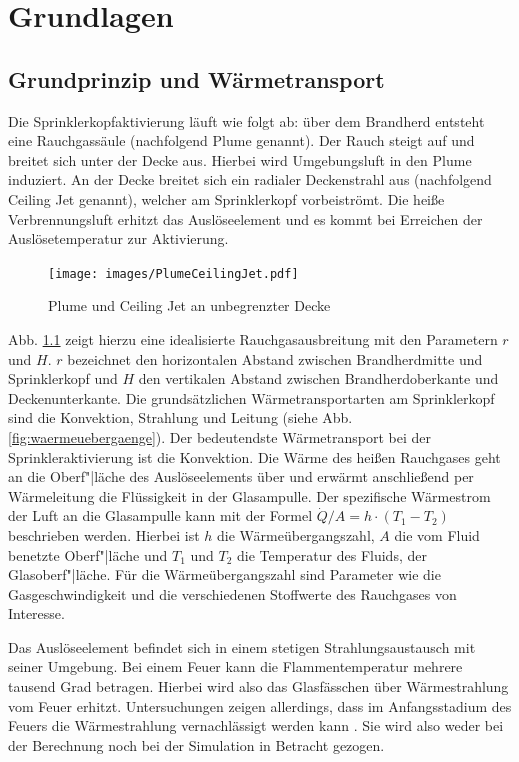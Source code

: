 \chapter{Grundlagen}
\label{cha:Grundlagen}
\section{Grundprinzip und Wärmetransport}
\label{sec:WaermeuebergaengeamSprinklerkopf}


Die Sprinklerkopfaktivierung läuft wie folgt ab: über dem Brandherd entsteht eine Rauchgassäule (nachfolgend Plume genannt). Der Rauch steigt auf und breitet sich unter der Decke aus. Hierbei wird Umgebungsluft in den Plume induziert. An der Decke breitet sich ein radialer Deckenstrahl aus (nachfolgend Ceiling Jet genannt), welcher am Sprinklerkopf vorbeiströmt. Die heiße Verbrennungsluft erhitzt das Auslöseelement und es kommt bei Erreichen der Auslösetemperatur zur Aktivierung. 
\begin{figure}
    \centering
    \texttt{[image: images/PlumeCeilingJet.pdf]}
    \caption{Plume und Ceiling Jet an unbegrenzter Decke \cite{SFPE5th}}
    \label{fig:PlumeUndJet}
\end{figure}
Abb. \ref{fig:PlumeUndJet} zeigt hierzu eine idealisierte Rauchgasausbreitung mit den Parametern $r$ und $H$. $r$ bezeichnet den horizontalen Abstand zwischen Brandherdmitte und Sprinklerkopf und $H$ den vertikalen Abstand zwischen Brandherdoberkante und Deckenunterkante.
Die grundsätzlichen Wärmetransportarten am Sprinklerkopf sind die Konvektion, Strahlung und Leitung (siehe Abb. \ref{fig:waermeuebergaenge}). Der bedeutendste Wärmetransport bei der Sprinkleraktivierung ist die Konvektion. Die Wärme des heißen Rauchgases geht an die Oberf"|läche des Auslöseelements über und erwärmt anschließend per Wärmeleitung die Flüssigkeit in der Glasampulle. 
Der spezifische Wärmestrom der Luft an die Glasampulle kann mit der Formel $\Dot{Q}/A=h \cdot (T_1 - T_2)$ beschrieben werden. Hierbei ist $h$ die Wärmeübergangszahl, $A$ die vom Fluid benetzte Oberf"|läche und $T_1$ und $T_2$ die Temperatur des Fluids, \bzw der Glasoberf"|läche. Für die Wärmeübergangszahl sind Parameter wie die Gasgeschwindigkeit und die verschiedenen Stoffwerte des Rauchgases von Interesse. 


Das Auslöseelement befindet sich in einem stetigen Strahlungsaustausch mit seiner Umgebung. Bei einem Feuer kann die Flammentemperatur mehrere tausend Grad betragen. Hierbei wird also das Glasfässchen über Wärmestrahlung vom Feuer erhitzt. Untersuchungen zeigen allerdings, dass im Anfangsstadium des Feuers die Wärmestrahlung vernachlässigt werden kann \cite[S. 1320]{SFPE5th}. Sie wird also weder bei der Berechnung noch bei der Simulation in Betracht gezogen. 

